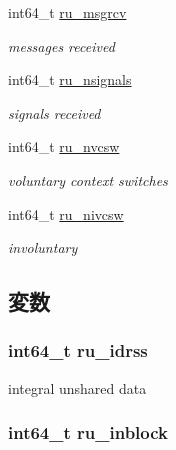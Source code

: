 \begin{DoxyCompactItemize}
int64\_\-t \hyperlink{structLinux_1_1rusage_a76a1a216776ce4c8e99d59e12b94469d}{ru\_\-msgrcv}
\begin{DoxyCompactList}\small\item\em messages received \item\end{DoxyCompactList}\item 
int64\_\-t \hyperlink{structLinux_1_1rusage_afafc5b85af3aa14ff03dc9051cd99803}{ru\_\-nsignals}
\begin{DoxyCompactList}\small\item\em signals received \item\end{DoxyCompactList}\item 
int64\_\-t \hyperlink{structLinux_1_1rusage_a488b8289bbd360fe61edb0bc26ccdb4d}{ru\_\-nvcsw}
\begin{DoxyCompactList}\small\item\em voluntary context switches \item\end{DoxyCompactList}\item 
int64\_\-t \hyperlink{structLinux_1_1rusage_ad6c040bd0a4bea27aac25d2b46398f13}{ru\_\-nivcsw}
\begin{DoxyCompactList}\small\item\em involuntary  \item\end{DoxyCompactList}\end{DoxyCompactItemize}


\subsection{変数}
\hypertarget{structLinux_1_1rusage_a957d4290597d297f4fe76a7136182b75}{
\subsubsection[{ru\_\-idrss}]{\setlength{\rightskip}{0pt plus 5cm}int64\_\-t {\bf ru\_\-idrss}}}
\label{structLinux_1_1rusage_a957d4290597d297f4fe76a7136182b75}


integral unshared data  \hypertarget{structLinux_1_1rusage_aa780084c2236b27d026fff5d04104c6a}{
\subsubsection[{ru\_\-inblock}]{\setlength{\rightskip}{0pt plus 5cm}int64\_\-t {\bf ru\_\-inblock}}}
\label{structLinux_1_1rusage_aa780084c2236b27d026fff5d04104c6a}


